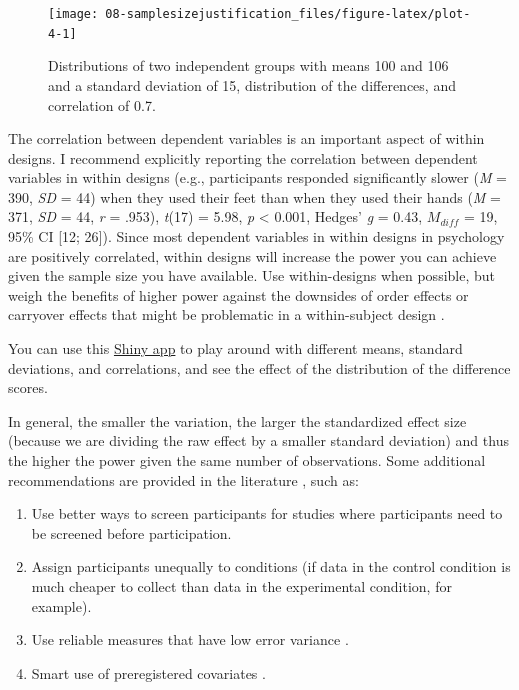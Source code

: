 \documentclass[
  oneside]{krantz}
\providecommand{\tightlist}{%
  \setlength{\itemsep}{0pt}\setlength{\parskip}{0pt}}
\begin{document}
\begin{figure}

{\centering \texttt{[image: 08-samplesizejustification\_files/figure-latex/plot-4-1]} 

}

\caption{Distributions of two independent groups with means 100 and 106 and a standard deviation of 15, distribution of the differences, and correlation of 0.7.}\label{fig:plot-4}
\end{figure}

The correlation between dependent variables is an important aspect of within designs. I recommend explicitly reporting the correlation between dependent variables in within designs (e.g., participants responded significantly slower (\emph{M} = 390, \emph{SD} = 44) when they used their feet than when they used their hands (\emph{M} = 371, \emph{SD} = 44, \emph{r} = .953), \emph{t}(17) = 5.98, \emph{p} \textless{} 0.001, Hedges' \emph{g} = 0.43, \(M_{diff}\) = 19, 95\% CI {[}12; 26{]}). Since most dependent variables in within designs in psychology are positively correlated, within designs will increase the power you can achieve given the sample size you have available. Use within-designs when possible, but weigh the benefits of higher power against the downsides of order effects or carryover effects that might be problematic in a within-subject design \citep{maxwell_designing_2017}.

You can use this \href{http://shiny.ieis.tue.nl/within_between/}{Shiny app} to play around with different means, standard deviations, and correlations, and see the effect of the distribution of the difference scores.

In general, the smaller the variation, the larger the standardized effect size (because we are dividing the raw effect by a smaller standard deviation) and thus the higher the power given the same number of observations. Some additional recommendations are provided in the literature \citep{allison_power_1997, bausell_power_2002, hallahan_statistical_1996}, such as:

\begin{enumerate}
\def\labelenumi{\arabic{enumi}.}
\tightlist
\item
  Use better ways to screen participants for studies where participants need to be screened before participation.
\item
  Assign participants unequally to conditions (if data in the control condition is much cheaper to collect than data in the experimental condition, for example).
\item
  Use reliable measures that have low error variance \citep{williams_impact_1995}.
\item
  Smart use of preregistered covariates \citep{meyvis_increasing_2018}.
\end{enumerate}
\end{document}
